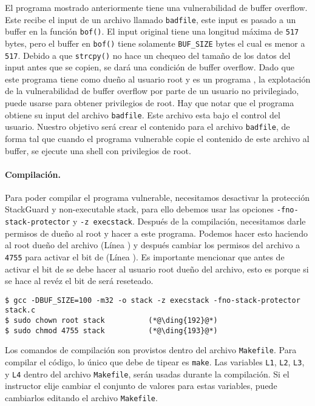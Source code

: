 El programa mostrado anteriormente tiene una vulnerabilidad de buffer overflow. Este recibe el input de un archivo llamado \texttt{badfile}, este input es pasado a un buffer en la función  {\tt bof()}. El input original tiene una longitud máxima de \texttt{517} bytes, pero el buffer en {\tt bof()}  tiene solamente  \texttt{BUF\_SIZE} bytes el cual es menor a \texttt{517}.
Debido a que {\tt strcpy()} no hace un chequeo del tamaño de los datos del input antes que se copien, se dará una condición de buffer overflow.
Dado que este programa tiene como dueño al usuario root y es un programa \setuid, la explotación de la vulnerabilidad de buffer overflow por parte de un usuario no privilegiado, puede usarse para obtener privilegios de root.
Hay que notar que el programa obtiene su input del archivo \texttt{badfile}. Este archivo esta bajo el control del usuario. Nuestro objetivo será crear el contenido para el archivo \texttt{badfile}, de forma tal que cuando el programa vulnerable copie el contenido de este archivo al buffer, se ejecute una shell con privilegios de root.


\paragraph{Compilación.}
Para poder compilar el programa vulnerable, necesitamos desactivar la protección StackGuard y non-executable stack, para ello debemos usar las opciones \texttt{-fno-stack-protector} y \texttt{-z execstack}.
Después de la compilación, necesitamos darle permisos de dueño al root y hacer \setuid a este programa. Podemos hacer esto haciendo al root dueño del archivo (Línea ) y después cambiar los permisos del archivo a \texttt{4755} para activar el bit de \setuid (Línea ). Es importante mencionar que antes de activar el bit de \setuid se debe hacer al usuario root dueño del archivo, esto es porque si se hace al revéz el bit de \setuid será reseteado.


\begin{lstlisting}
$ gcc -DBUF_SIZE=100 -m32 -o stack -z execstack -fno-stack-protector stack.c
$ sudo chown root stack          (*@\ding{192}@*)
$ sudo chmod 4755 stack          (*@\ding{193}@*)
\end{lstlisting}

Los comandos de compilación son provistos dentro del archivo \texttt{Makefile}. Para compilar el código, lo único que debe de tipear es \texttt{make}. Las variables \texttt{L1}, \texttt{L2}, \texttt{L3}, y \texttt{L4} dentro del archivo \texttt{Makefile}, serán usadas durante la compilación.
Si el instructor elije cambiar el conjunto de valores para estas variables, puede cambiarlos editando el archivo \texttt{Makefile}.


